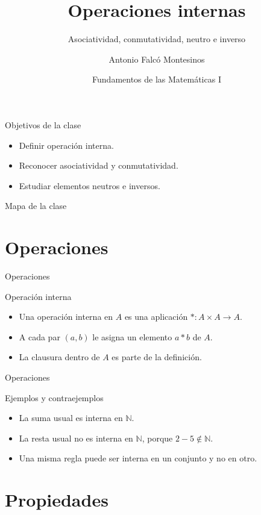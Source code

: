 \documentclass[aspectratio=169,11pt]{beamer}
\title[FdM I -- Clase 12]{Operaciones internas}
\subtitle{Asociatividad, conmutatividad, neutro e inverso}
\author{Antonio Falcó Montesinos}
\institute{Universidad CEU Cardenal Herrera}
\date{Fundamentos de las Matemáticas I}
\begin{document}
\begin{frame}
  \titlepage
\end{frame}

\begin{frame}{Objetivos de la clase}
\begin{itemize}
  \item Definir operación interna.
  \item Reconocer asociatividad y conmutatividad.
  \item Estudiar elementos neutros e inversos.
\end{itemize}
\end{frame}

\begin{frame}{Mapa de la clase}
\tableofcontents
\end{frame}

\section{Operaciones}

\begin{frame}{Operaciones}
\begin{block}{Operación interna}
\begin{itemize}
  \item Una operación interna en \(A\) es una aplicación \(*:A\times A\to A\).
  \item A cada par \((a,b)\) le asigna un elemento \(a*b\) de \(A\).
  \item La clausura dentro de \(A\) es parte de la definición.
\end{itemize}
\end{block}
\end{frame}

\begin{frame}{Operaciones}
\begin{block}{Ejemplos y contraejemplos}
\begin{itemize}
  \item La suma usual es interna en \(\mathbb{N}\).
  \item La resta usual no es interna en \(\mathbb{N}\), porque \(2-5\notin\mathbb{N}\).
  \item Una misma regla puede ser interna en un conjunto y no en otro.
\end{itemize}
\end{block}
\end{frame}

\section{Propiedades}
\end{document}
